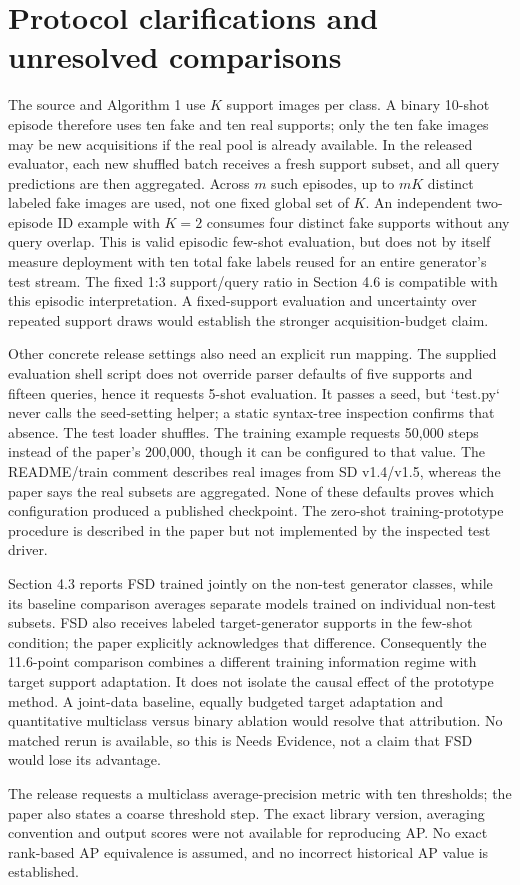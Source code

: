 \documentclass[10pt]{article}
\begin{document}
\section*{Protocol clarifications and unresolved comparisons}
The source and Algorithm 1 use \(K\) support images per class. A binary 10-shot episode therefore uses ten fake and ten real supports; only the ten fake images may be new acquisitions if the real pool is already available. In the released evaluator, each new shuffled batch receives a fresh support subset, and all query predictions are then aggregated. Across \(m\) such episodes, up to \(mK\) distinct labeled fake images are used, not one fixed global set of \(K\). An independent two-episode ID example with \(K=2\) consumes four distinct fake supports without any query overlap. This is valid episodic few-shot evaluation, but does not by itself measure deployment with ten total fake labels reused for an entire generator’s test stream. The fixed 1:3 support/query ratio in Section 4.6 is compatible with this episodic interpretation. A fixed-support evaluation and uncertainty over repeated support draws would establish the stronger acquisition-budget claim.\par
Other concrete release settings also need an explicit run mapping. The supplied evaluation shell script does not override parser defaults of five supports and fifteen queries, hence it requests 5-shot evaluation. It passes a seed, but `test.py` never calls the seed-setting helper; a static syntax-tree inspection confirms that absence. The test loader shuffles. The training example requests 50,000 steps instead of the paper’s 200,000, though it can be configured to that value. The README/train comment describes real images from SD v1.4/v1.5, whereas the paper says the real subsets are aggregated. None of these defaults proves which configuration produced a published checkpoint. The zero-shot training-prototype procedure is described in the paper but not implemented by the inspected test driver.\par
Section 4.3 reports FSD trained jointly on the non-test generator classes, while its baseline comparison averages separate models trained on individual non-test subsets. FSD also receives labeled target-generator supports in the few-shot condition; the paper explicitly acknowledges that difference. Consequently the 11.6-point comparison combines a different training information regime with target support adaptation. It does not isolate the causal effect of the prototype method. A joint-data baseline, equally budgeted target adaptation and quantitative multiclass versus binary ablation would resolve that attribution. No matched rerun is available, so this is Needs Evidence, not a claim that FSD would lose its advantage.\par
The release requests a multiclass average-precision metric with ten thresholds; the paper also states a coarse threshold step. The exact library version, averaging convention and output scores were not available for reproducing AP. No exact rank-based AP equivalence is assumed, and no incorrect historical AP value is established.\par
\end{document}
